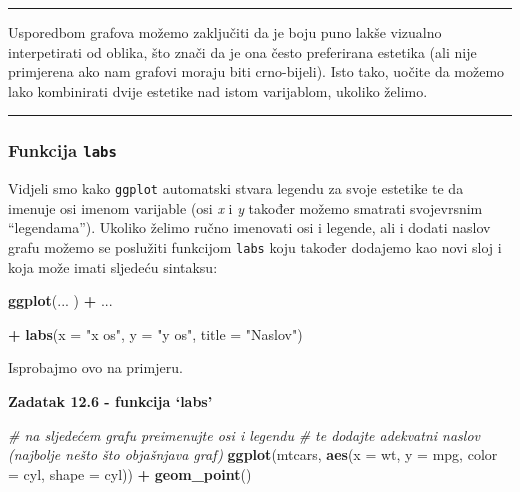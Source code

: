 \documentclass[]{book}
\newenvironment{Shaded}{\begin{snugshade}}{\end{snugshade}}
\newcommand{\KeywordTok}[1]{\textcolor[rgb]{0.13,0.29,0.53}{\textbf{#1}}}
\newcommand{\DataTypeTok}[1]{\textcolor[rgb]{0.13,0.29,0.53}{#1}}
\newcommand{\StringTok}[1]{\textcolor[rgb]{0.31,0.60,0.02}{#1}}
\newcommand{\CommentTok}[1]{\textcolor[rgb]{0.56,0.35,0.01}{\textit{#1}}}
\newcommand{\OperatorTok}[1]{\textcolor[rgb]{0.81,0.36,0.00}{\textbf{#1}}}
\newcommand{\NormalTok}[1]{#1}
\theoremstyle{definition}
\theoremstyle{definition}
\theoremstyle{definition}
\theoremstyle{remark}
\begin{document}
\begin{center}\rule{0.5\linewidth}{\linethickness}\end{center}

Usporedbom grafova možemo zaključiti da je boju puno lakše vizualno
interpetirati od oblika, što znači da je ona često preferirana estetika
(ali nije primjerena ako nam grafovi moraju biti crno-bijeli). Isto
tako, uočite da možemo lako kombinirati dvije estetike nad istom
varijablom, ukoliko želimo.

\begin{center}\rule{0.5\linewidth}{\linethickness}\end{center}

\subsubsection{\texorpdfstring{Funkcija
\texttt{labs}}{Funkcija labs}}\label{funkcija-labs}

Vidjeli smo kako \texttt{ggplot} automatski stvara legendu za svoje
estetike te da imenuje osi imenom varijable (osi \emph{x} i \emph{y}
također možemo smatrati svojevrsnim ``legendama''). Ukoliko želimo ručno
imenovati osi i legende, ali i dodati naslov grafu možemo se poslužiti
funkcijom \texttt{labs} koju također dodajemo kao novi sloj i koja može
imati sljedeću sintaksu:

\begin{Shaded}
\begin{Highlighting}[]
\KeywordTok{ggplot}\NormalTok{(... ) }\OperatorTok{+}\StringTok{ }\NormalTok{...}

\OperatorTok{+}\StringTok{ }\KeywordTok{labs}\NormalTok{(}\DataTypeTok{x =} \StringTok{"x os"}\NormalTok{, }\DataTypeTok{y =} \StringTok{"y os"}\NormalTok{, }\DataTypeTok{title =} \StringTok{"Naslov"}\NormalTok{)}
\end{Highlighting}
\end{Shaded}

Isprobajmo ovo na primjeru.

\textbf{Zadatak 12.6 - funkcija `labs'}

\begin{Shaded}
\begin{Highlighting}[]
\CommentTok{# na sljedećem grafu preimenujte osi i legendu}
\CommentTok{# te dodajte adekvatni naslov (najbolje nešto što objašnjava graf)}
\KeywordTok{ggplot}\NormalTok{(mtcars, }\KeywordTok{aes}\NormalTok{(}\DataTypeTok{x =}\NormalTok{ wt, }\DataTypeTok{y =}\NormalTok{ mpg, }\DataTypeTok{color =}\NormalTok{ cyl, }\DataTypeTok{shape =}\NormalTok{ cyl)) }\OperatorTok{+}\StringTok{ }\KeywordTok{geom_point}\NormalTok{() }
\end{Highlighting}
\end{Shaded}
\end{document}
